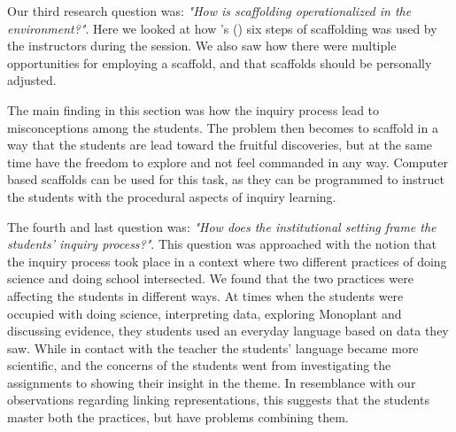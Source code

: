 
Our third research question was: \emph{"How is scaffolding operationalized in the environment?"}. Here we looked at how \citeauthor{wood1976role}'s (\citeyear{wood1976role}) six steps of scaffolding was used by the instructors during the session. We also saw how there were multiple opportunities for employing a scaffold, and that scaffolds should be personally adjusted. 

The main finding in this section was how the inquiry process lead to misconceptions among the students. The problem then becomes to scaffold in a way that the students are lead toward the fruitful discoveries, but at the same time have the freedom to explore and not feel commanded in any way. Computer based scaffolds can be used for this task, as they can be programmed to instruct the students with the procedural aspects of inquiry learning. 

The fourth and last question was: \emph{"How does the institutional setting frame the students' inquiry process?"}. This question was approached with the notion that the inquiry process took place in a context where two different practices of doing science and doing school intersected. We found that the two practices were affecting the students in different ways. At times when the students were occupied with doing science, interpreting data, exploring Monoplant and discussing evidence, they students used an everyday language based on data they saw. While in contact with the teacher the students' language became more scientific, and the concerns of the students went from investigating the assignments to showing their insight in the theme. In resemblance with our observations regarding linking representations, this suggests that the students master both the practices, but have problems combining them.

